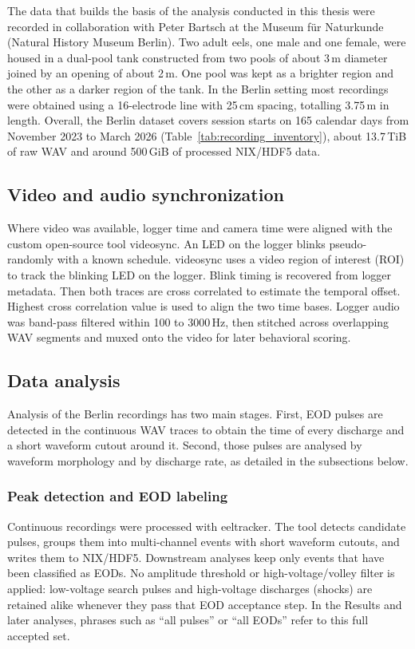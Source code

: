 The data that builds the basis of the analysis conducted in this thesis were recorded in collaboration with Peter Bartsch at the Museum f{\"u}r Naturkunde (Natural History Museum Berlin).
Two adult eels, one male and one female, were housed in a dual-pool tank constructed from two pools of about 3\,m diameter joined by an opening of about 2\,m.
One pool was kept as a brighter region and the other as a darker region of the tank.
In the Berlin setting most recordings were obtained using a 16-electrode line with 25\,cm spacing, totalling 3.75\,m in length.
Overall, the Berlin dataset covers session starts on 165 calendar days from November 2023 to March 2026 (Table~\ref{tab:recording_inventory}), about 13.7\,TiB of raw WAV and around 500\,GiB of processed NIX/HDF5 data.

\subsection{Video and audio synchronization}

Where video was available, logger time and camera time were aligned with the custom open-source tool videosync. 
An LED on the logger blinks pseudo-randomly with a known schedule. 
videosync uses a video region of interest (ROI) to track the blinking LED on the logger.
Blink timing is recovered from logger metadata. 
Then both traces are cross correlated to estimate the temporal offset. 
Highest cross correlation value is used to align the two time bases.
Logger audio was band-pass filtered within 100 to 3000\,Hz, then stitched across overlapping WAV segments and muxed onto the video for later behavioral scoring.

\subsection{Data analysis}

Analysis of the Berlin recordings has two main stages.
First, EOD pulses are detected in the continuous WAV traces to obtain the time of every discharge and a short waveform cutout around it.
Second, those pulses are analysed by waveform morphology and by discharge rate, as detailed in the subsections below.

\subsubsection{Peak detection and EOD labeling}

Continuous recordings were processed with eeltracker.
The tool detects candidate pulses, groups them into multi-channel events with short waveform cutouts, and writes them to NIX/HDF5.
Downstream analyses keep only events that have been classified as EODs.
No amplitude threshold or high-voltage/volley filter is applied: low-voltage search pulses and high-voltage discharges (shocks) are retained alike whenever they pass that EOD acceptance step.
In the Results and later analyses, phrases such as ``all pulses'' or ``all EODs'' refer to this full accepted set.

